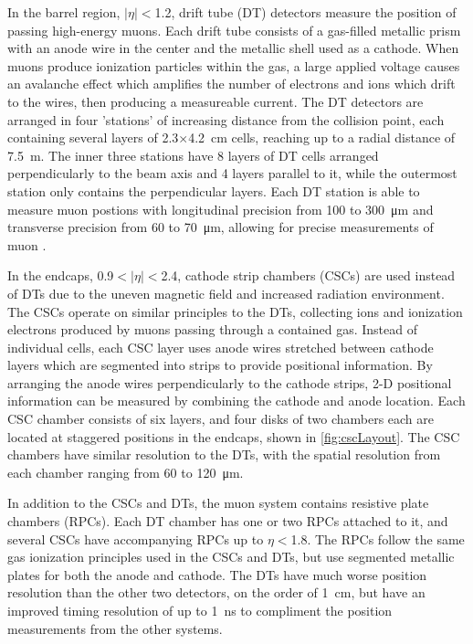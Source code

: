 In the barrel region, $\lvert\eta\rvert<$1.2, drift tube (DT) detectors measure the position of passing high-energy muons. 
Each drift tube consists of a gas-filled metallic prism with an anode wire in the center and the metallic shell used as a cathode.
When muons produce ionization particles within the gas, a large applied voltage causes an avalanche effect which amplifies the number of electrons and ions which drift to the wires, then producing a measureable current.
The DT detectors are arranged in four 'stations' of increasing distance from the collision point, each containing several layers of 2.3$\times$\SI{4.2}{\centi\meter} cells, reaching up to a radial distance of \SI{7.5}{\meter}. 
The inner three stations have 8 layers of DT cells arranged perpendicularly to the beam axis and 4 layers parallel to it, while the outermost station only contains the perpendicular layers.
Each DT station is able to measure muon postions with longitudinal precision from 100 to \SI{300}{\micro\meter} and transverse precision from  60 to \SI{70}{\micro\meter}, allowing for precise measurements of muon \pt. 

In the endcaps, 0.9$<\lvert\eta\rvert<$2.4, cathode strip chambers (CSCs) are used instead of DTs due to the uneven magnetic field and increased radiation environment.
The CSCs operate on similar principles to the DTs, collecting ions and ionization electrons produced by muons passing through a contained gas. 
Instead of individual cells, each CSC layer uses anode wires stretched between cathode layers which are segmented into strips to provide positional information. 
By arranging the anode wires perpendicularly to the cathode strips, 2-D positional information can be measured by combining the cathode and anode location. 
Each CSC chamber consists of six layers, and four disks of two chambers each are located at staggered positions in the endcaps, shown in \cref{fig:cscLayout}. 
The CSC chambers have similar resolution to the DTs, with the spatial resolution from each chamber ranging from 60 to \SI{120}{\micro\meter}.

In addition to the CSCs and DTs, the muon system contains resistive plate chambers (RPCs). 
Each DT chamber has one or two RPCs attached to it, and several CSCs have accompanying RPCs up to $\eta<$1.8. 
The RPCs follow the same gas ionization principles used in the CSCs and DTs, but use segmented metallic plates for both the anode and cathode.
The DTs have much worse position resolution than the other two detectors, on the order of \SI{1}{\centi\meter}, but have an improved timing resolution of up to \SI{1}{\nano\second} to compliment the position measurements from the other systems.

